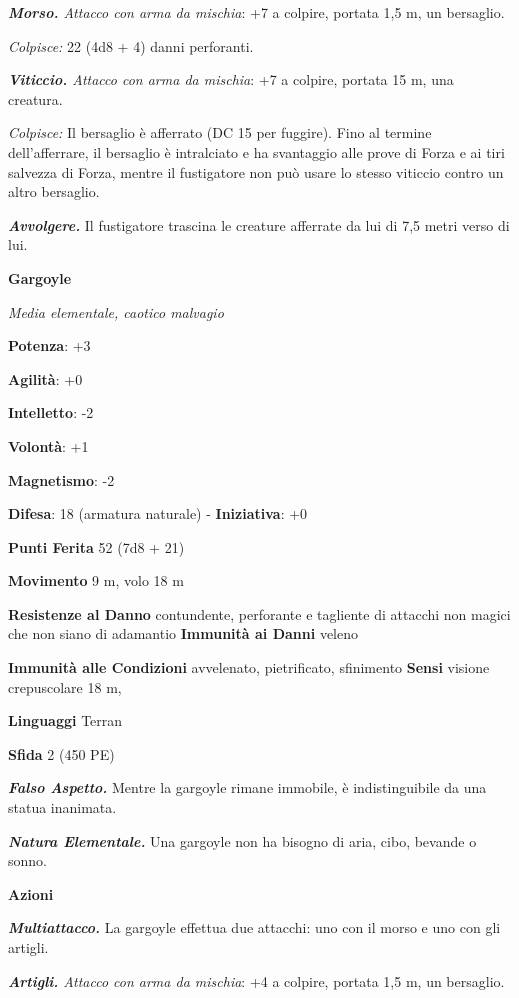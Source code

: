 \begin{multicols}{2}
\emph{\textbf{Morso.} Attacco con arma da mischia}: +7 a colpire,
portata 1,5 m, un bersaglio.

\emph{Colpisce:} 22 (4d8 + 4) danni perforanti.

\emph{\textbf{Viticcio.} Attacco con arma da mischia}: +7 a colpire,
portata 15 m, una creatura.

\emph{Colpisce:} Il bersaglio è afferrato (DC 15 per fuggire). Fino al
termine dell'afferrare, il bersaglio è intralciato e ha svantaggio alle
prove di Forza e ai tiri salvezza di Forza, mentre il fustigatore non
può usare lo stesso viticcio contro un altro bersaglio.

\emph{\textbf{Avvolgere.}} Il fustigatore trascina le creature afferrate
da lui di 7,5 metri verso di lui.

\textbf{Gargoyle}

\emph{Media elementale, caotico malvagio}

\textbf{Potenza}: +3

\textbf{Agilità}: +0

\textbf{Intelletto}: -2

\textbf{Volontà}: +1

\textbf{Magnetismo}: -2

\textbf{Difesa}: 18 (armatura naturale) - \textbf{Iniziativa}: +0

\textbf{Punti Ferita} 52 (7d8 + 21)

\textbf{Movimento} 9 m, volo 18 m

\textbf{Resistenze al Danno} contundente, perforante e tagliente di
attacchi non magici che non siano di adamantio \textbf{Immunità ai
Danni} veleno

\textbf{Immunità alle Condizioni} avvelenato, pietrificato, sfinimento
\textbf{Sensi} visione crepuscolare 18 m, 

\textbf{Linguaggi} Terran

\textbf{Sfida} 2 (450 PE)

\emph{\textbf{Falso Aspetto.}} Mentre la gargoyle rimane immobile, è
indistinguibile da una statua inanimata.

\emph{\textbf{Natura Elementale.}} Una gargoyle non ha bisogno di aria,
cibo, bevande o sonno.

\textbf{Azioni}

\emph{\textbf{Multiattacco.}} La gargoyle effettua due attacchi: uno con
il morso e uno con gli artigli.

\emph{\textbf{Artigli.} Attacco con arma da mischia}: +4 a colpire,
portata 1,5 m, un bersaglio.


\end{multicols}
